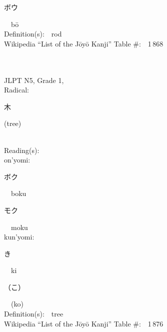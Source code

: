 \begin{multicols}{2}
{\hspace*{2em}}{\begin{CJK}{UTF8}{min} ボウ \end{CJK}}\ \ b\=o\ \ \\
Definition(s):\ \ rod \\
Wikipedia ``List of the J\=oy\=o Kanji'' Table \#:\ \ 1\,868 \\
\ \ \\
{\fontsize{34pt}{40pt}  }\ \ \\  %
{JLPT N5, Grade 1, \\Radical:\ \ {\begin{CJK}{UTF8}{min} 木 \end{CJK}} (tree) } \\
Reading(s):\ \ \\
{\hspace*{1em}}on'yomi:\ \ \\
{\hspace*{2em}}{\begin{CJK}{UTF8}{min} ボク \end{CJK}}\ \ boku\ \ \\
{\hspace*{2em}}{\begin{CJK}{UTF8}{min} モク \end{CJK}}\ \ moku\ \ \\
{\hspace*{1em}}kun'yomi:\ \ \\
{\hspace*{2em}}{\begin{CJK}{UTF8}{min} き \end{CJK}}\ \ ki\ \ \\
{\hspace*{2em}}{\begin{CJK}{UTF8}{min} （こ） \end{CJK}}\ \ (ko)\ \ \\
Definition(s):\ \ tree \\
Wikipedia ``List of the J\=oy\=o Kanji'' Table \#:\ \ 1\,876 \\
\ \ \\
{\fontsize{34pt}{40pt}  }\ \ \\  %

\end{multicols}
